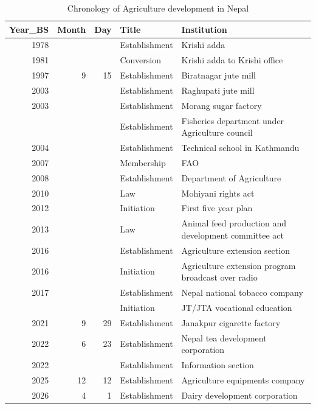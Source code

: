 \documentclass[
  openany]{book}
\begin{document}
\begin{table}[H]

\caption{\label{tab:agriculture-chronology}Chronology of Agriculture development in Nepal}
\centering
\begin{tabular}[t]{rrrll}
\toprule
Year\_BS & Month & Day & Title & Institution\\
\midrule
\rowcolor{gray!6}  1978 &  &  & Establishment & Krishi adda\\
1981 &  &  & Conversion & Krishi adda to Krishi office\\
\rowcolor{gray!6}  1997 & 9 & 15 & Establishment & Biratnagar jute mill\\
2003 &  &  & Establishment & Raghupati jute mill\\
\rowcolor{gray!6}  2003 &  &  & Establishment & Morang sugar factory\\
\addlinespace
2003 &  &  & Establishment & Fisheries department under Agriculture council\\
\rowcolor{gray!6}  2004 &  &  & Establishment & Technical school in Kathmandu\\
2007 &  &  & Membership & FAO\\
\rowcolor{gray!6}  2008 &  &  & Establishment & Department of Agriculture\\
2010 &  &  & Law & Mohiyani rights act\\
\addlinespace
\rowcolor{gray!6}  2012 &  &  & Initiation & First five year plan\\
2013 &  &  & Law & Animal feed production and development committee act\\
\rowcolor{gray!6}  2016 &  &  & Establishment & Agriculture extension section\\
2016 &  &  & Initiation & Agriculture extension program broadcast over radio\\
\rowcolor{gray!6}  2017 &  &  & Establishment & Nepal national tobacco company\\
\addlinespace
2018 &  &  & Initiation & JT/JTA vocational education\\
\rowcolor{gray!6}  2021 & 9 & 29 & Establishment & Janakpur cigarette factory\\
2022 & 6 & 23 & Establishment & Nepal tea development corporation\\
\rowcolor{gray!6}  2022 &  &  & Establishment & Information section\\
2025 & 12 & 12 & Establishment & Agriculture equipments company\\
\addlinespace
\rowcolor{gray!6}  2026 & 4 & 1 & Establishment & Dairy development corporation\\

\end{tabular}
\end{table}
\end{document}
